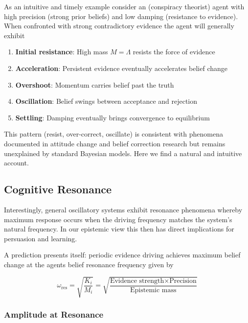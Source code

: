 \documentclass[12pt]{article}
\begin{document}
As an intuitive and timely example consider an (conspiracy theorist) agent with high precision (strong prior beliefs) and low damping (resistance to evidence). When confronted with strong contradictory evidence the agent will generally exhibit

\begin{enumerate}
\item \textbf{Initial resistance}: High mass $M = \Lambda$ resists the force of evidence
\item \textbf{Acceleration}: Persistent evidence eventually accelerates belief change
\item \textbf{Overshoot}: Momentum carries belief past the truth
\item \textbf{Oscillation}: Belief swings between acceptance and rejection
\item \textbf{Settling}: Damping eventually brings convergence to equilibrium
\end{enumerate}

This pattern (resist, over-correct, oscillate) is consistent with phenomena documented in attitude change and belief correction research \citet{Eagly1993, Lewandowsky2012} but remains unexplained by standard Bayesian models. Here we find a natural and intuitive account.

\subsection{Cognitive Resonance}

Interestingly, general oscillatory systems exhibit resonance phenomena whereby maximum response occurs when the driving frequency matches the system's natural frequency. In our epistemic view this then has direct implications for persuasion and learning.


A prediction presents itself: periodic evidence driving achieves maximum belief change at the agents belief resonance frequency given by

\begin{equation}
\boxed{\omega_{\text{res}} = \sqrt{\frac{K_i}{M_i}} = \sqrt{\frac{\text{Evidence strength} \times \text{Precision}}{\text{Epistemic mass}}}}
\end{equation}


\subsubsection{Amplitude at Resonance}
\end{document}
